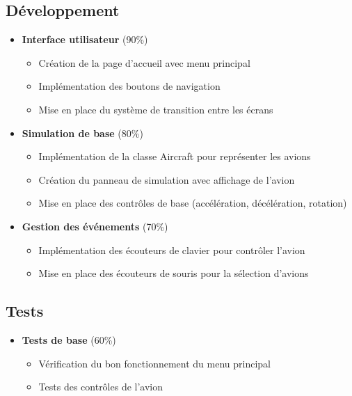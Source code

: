 \documentclass[12pt,a4paper]{article}
\begin{document}
\subsection{Développement}
\begin{itemize}
    \item \textbf{Interface utilisateur} (90\%)
    \begin{itemize}
        \item Création de la page d'accueil avec menu principal
        \item Implémentation des boutons de navigation
        \item Mise en place du système de transition entre les écrans
    \end{itemize}
    
    \item \textbf{Simulation de base} (80\%)
    \begin{itemize}
        \item Implémentation de la classe Aircraft pour représenter les avions
        \item Création du panneau de simulation avec affichage de l'avion
        \item Mise en place des contrôles de base (accélération, décélération, rotation)
        \end{itemize}
    
    \item \textbf{Gestion des événements} (70\%)
    \begin{itemize}
        \item Implémentation des écouteurs de clavier pour contrôler l'avion
        \item Mise en place des écouteurs de souris pour la sélection d'avions
    \end{itemize}
\end{itemize}

\subsection{Tests}
\begin{itemize}
    \item \textbf{Tests de base} (60\%)
    \begin{itemize}
        \item Vérification du bon fonctionnement du menu principal
        \item Tests des contrôles de l'avion
    \end{itemize}
\end{itemize}
\end{document}
